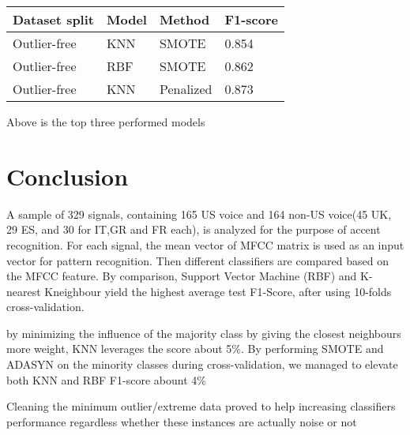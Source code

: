 \documentclass[11pt]{article}
\makeatletter
\newcommand{\boxspacing}{\kern\kvtcb@left@rule\kern\kvtcb@boxsep}
\newcommand{\prompt}[4]{
        {\ttfamily\llap{{\color{#2}[#3]:\hspace{3pt}#4}}\vspace{-\baselineskip}}
    }
\makeatother
\begin{document}
    \begin{longtable}[]{@{}llll@{}}
\toprule
Dataset split & Model & Method & F1-score\tabularnewline
\midrule
\endhead
Outlier-free & KNN & SMOTE & 0.854\tabularnewline
Outlier-free & RBF & SMOTE & 0.862\tabularnewline
Outlier-free & KNN & Penalized & 0.873\tabularnewline
\bottomrule
\end{longtable}

    Above is the top three performed models

    \hypertarget{conclusion}{%
\section{Conclusion}\label{conclusion}}

A sample of 329 signals, containing 165 US voice and 164 non-US voice(45
UK, 29 ES, and 30 for IT,GR and FR each), is analyzed for the purpose of
accent recognition. For each signal, the mean vector of MFCC matrix is
used as an input vector for pattern recognition. Then different
classifiers are compared based on the MFCC feature. By comparison,
Support Vector Machine (RBF) and K-nearest Kneighbour yield the highest
average test F1-Score, after using 10-folds cross-validation.

by minimizing the influence of the majority class by giving the closest
neighbours more weight, KNN leverages the score about 5\%. By performing
SMOTE and ADASYN on the minority classes during cross-validation, we
managed to elevate both KNN and RBF F1-score abount 4\%

Cleaning the minimum outlier/extreme data proved to help increasing
classifiers performance regardless whether these instances are actually
noise or not

    \begin{tcolorbox}[breakable, size=fbox, boxrule=1pt, pad at break*=1mm,colback=cellbackground, colframe=cellborder]
\prompt{In}{incolor}{ }{\boxspacing}
\begin{Verbatim}[commandchars=\\\{\}]

\end{Verbatim}
\end{tcolorbox}


    
    
    
\end{document}
